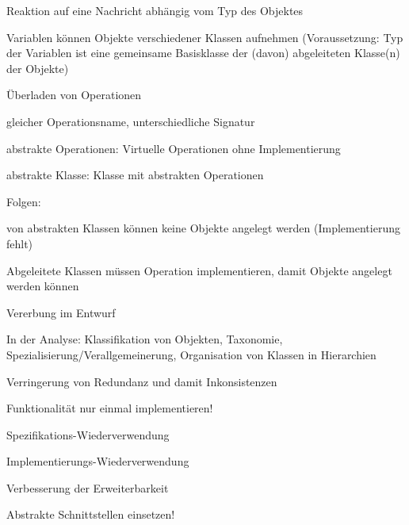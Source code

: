 \documentclass[a4paper]{article}
\begin{document}
\begin{multicols}{3}
\begin{itemize*}
\begin{itemize*}
      \begin{itemize*}
        \item Reaktion auf eine Nachricht abhängig vom Typ des Objektes
        \item Variablen können Objekte verschiedener Klassen aufnehmen (Voraussetzung: Typ der Variablen ist eine gemeinsame Basisklasse der (davon) abgeleiteten Klasse(n) der Objekte)
        \item Überladen von Operationen
        \item gleicher Operationsname, unterschiedliche Signatur
        \item abstrakte Operationen: Virtuelle Operationen ohne Implementierung
        \item abstrakte Klasse: Klasse mit abstrakten Operationen
        \item Folgen:
        \item von abstrakten Klassen können keine Objekte angelegt werden (Implementierung fehlt)
        \item Abgeleitete Klassen müssen Operation implementieren, damit Objekte angelegt werden können
      \end{itemize*}
    \end{itemize*}
  \end{itemize*}

  Vererbung im Entwurf
  \begin{itemize*}
    \item In der Analyse: Klassifikation von Objekten, Taxonomie, Spezialisierung/Verallgemeinerung, Organisation von Klassen in Hierarchien
    \item Verringerung von Redundanz und damit Inkonsistenzen
    \begin{itemize*}
      \item Funktionalität nur einmal implementieren!
      \item Spezifikations-Wiederverwendung
      \item Implementierungs-Wiederverwendung
    \end{itemize*}
    \item Verbesserung der Erweiterbarkeit
    \begin{itemize*}
      \item Abstrakte Schnittstellen einsetzen!
    \end{itemize*}
  \end{itemize*}


\end{multicols}
\end{document}
